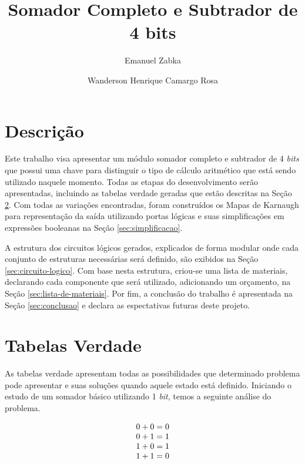 \documentclass{article}
\title{Somador Completo e Subtrador de 4 bits}
\author{Emanuel Zabka\inst{1} \and{} Wanderson Henrique Camargo Rosa\inst{1}}
\begin{document}
\maketitle{}

\section{Descrição}
\label{sec:descricao}

Este trabalho visa apresentar um módulo somador completo e subtrador de 4
\textit{bits} que possui uma chave para distinguir o tipo de cálculo aritmético
que está sendo utilizado naquele momento. Todas as etapas do desenvolvimento
serão apresentadas, incluindo as tabelas verdade geradas que estão descritas na
Seção \ref{sec:tabelas-verdade}. Com todas as variações encontradas, foram
construídos os Mapas de Karnaugh para representação da saída utilizando portas
lógicas e suas simplificações em expressões booleanas na Seção
\ref{sec:simplificacao}.

A estrutura dos circuitos lógicos gerados, explicados de forma modular onde cada
conjunto de estruturas necessárias será definido, são exibidos na Seção
\ref{sec:circuito-logico}. Com base nesta estrutura, criou-se uma lista de
materiais, declarando cada componente que será utilizado, adicionando um
orçamento, na Seção \ref{sec:lista-de-materiais}. Por fim, a conclusão do
trabalho é apresentada na Seção \ref{sec:conclusao} e declara as espectativas
futuras deste projeto.

\section{Tabelas Verdade}
\label{sec:tabelas-verdade}

As tabelas verdade apresentam todas as possibilidades que determinado problema
pode apresentar e suas soluções quando aquele estado está definido. Iniciando o
estudo de um somador básico utilizando 1 \textit{bit}, temos a seguinte análise
do problema.

\begin{equation*}
    \begin{array}[b]{r}
        0+0=0\\
        0+1=1\\
        1+0=1\\
        1+1=0
    \end{array}
\end{equation*}
\end{document}
